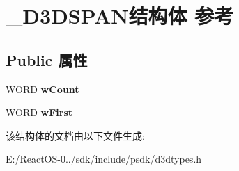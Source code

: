 \hypertarget{struct___d3_d_s_p_a_n}{}\section{\+\_\+\+D3\+D\+S\+P\+A\+N结构体 参考}
\label{struct___d3_d_s_p_a_n}
\subsection*{Public 属性}
\begin{DoxyCompactItemize}
\item 
\mbox{\label{struct___d3_d_s_p_a_n_a6f505a25793d5ccaaf31af0abd76a8a9}} 
W\+O\+RD {\bfseries w\+Count}
\item 
\mbox{\label{struct___d3_d_s_p_a_n_a6a2d08f001e79cf231639199c241963d}} 
W\+O\+RD {\bfseries w\+First}
\end{DoxyCompactItemize}


该结构体的文档由以下文件生成\+:\begin{DoxyCompactItemize}
\item 
E\+:/\+React\+O\+S-\/0../sdk/include/psdk/d3dtypes.\+h\end{DoxyCompactItemize}
